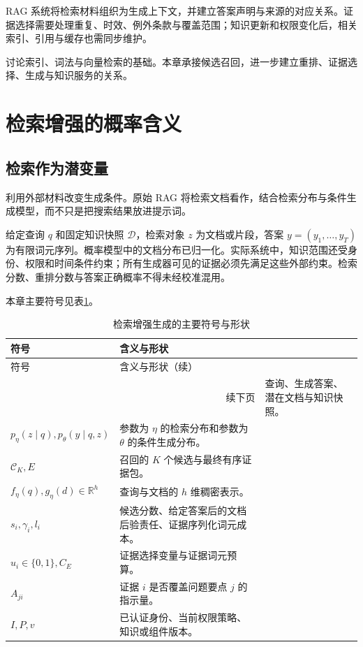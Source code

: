 \documentclass[../textbook.tex]{subfiles}
\begin{document}
\fi
{}

RAG 系统将检索材料组织为生成上下文，并建立答案声明与来源的对应关系。证据选择需要处理重复、时效、例外条款与覆盖范围；知识更新和权限变化后，相关索引、引用与缓存也需同步维护。

讨论索引、词法与向量检索的基础。本章承接候选召回，进一步建立重排、证据选择、生成与知识服务的关系。

\section{检索增强的概率含义}

\subsection{检索作为潜变量}
利用外部材料改变生成条件。原始 RAG 将检索文档看作，结合检索分布与条件生成模型，而不只是把搜索结果放进提示词。\cite{lewis2020rag}

\begin{assumption}[概率模型与服务边界]
给定查询 $q$ 和固定知识快照 $\mathcal D$，检索对象 $z$ 为文档或片段，答案 $y=(y_1,\ldots,y_T)$ 为有限词元序列。概率模型中的文档分布已归一化。实际系统中，知识范围还受身份、权限和时间条件约束；所有生成器可见的证据必须先满足这些外部约束。检索分数、重排分数与答案正确概率不得未经校准混用。
\end{assumption}

本章主要符号见表\ref{tab:rag-systems-symbols}。
\begin{longtable}{@{}p{.32\linewidth}p{.64\linewidth}@{}}
\caption{检索增强生成的主要符号与形状}\label{tab:rag-systems-symbols}\\
\toprule 符号 & 含义与形状\\\midrule
\endfirsthead
\toprule 符号 & 含义与形状（续）\\\midrule
\endhead
\midrule
\multicolumn{2}{r}{续下页}\
\endfoot
\bottomrule
\endlastfoot
$q,y,z,\mathcal D$ & 查询、生成答案、潜在文档与知识快照。\\
$p_\eta(z\mid q),p_\theta(y\mid q,z)$ & 参数为 $\eta$ 的检索分布和参数为 $\theta$ 的条件生成分布。\\
$\mathcal C_K,E$ & 召回的 $K$ 个候选与最终有序证据包。\\
$f_\eta(q),g_\eta(d)\in\mathbb R^h$ & 查询与文档的 $h$ 维稠密表示。\\
$s_i,\gamma_i,l_i$ & 候选分数、给定答案后的文档后验责任、证据序列化词元成本。\\
$u_i\in\{0,1\},C_E$ & 证据选择变量与证据词元预算。\\
$A_{ji}$ & 证据 $i$ 是否覆盖问题要点 $j$ 的指示量。\\
$I,P,v$ & 已认证身份、当前权限策略、知识或组件版本。\\
\end{longtable}
\end{document}
